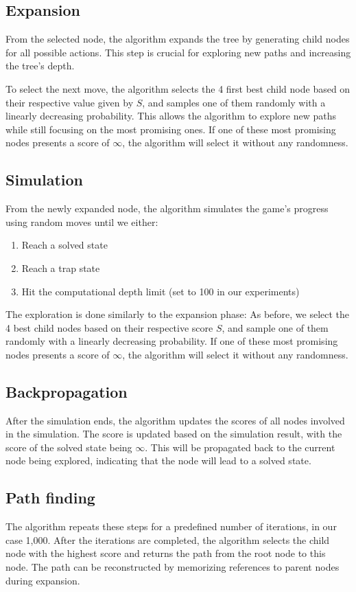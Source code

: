 \subsection{Expansion}
From the selected node, the algorithm expands the tree by generating child nodes for all possible actions. This step is crucial for exploring new paths and increasing the tree's depth.

To select the next move, the algorithm selects the 4 first best child node based on their respective value given by $S$, and samples one of them randomly with a linearly decreasing probability. This allows the algorithm to explore new paths while still focusing on the most promising ones. If one of these most promising nodes presents a score of $\infty$, the algorithm will select it without any randomness.

\subsection{Simulation}
From the newly expanded node, the algorithm simulates the game's progress using random moves until we either:
\begin{enumerate}
    \item Reach a solved state
    \item Reach a trap state
    \item Hit the computational depth limit (set to 100 in our experiments)
\end{enumerate}
The exploration is done similarly to the expansion phase: As before, we select the 4 best child nodes based on their respective score $S$, and sample one of them randomly with a linearly decreasing probability. If one of these most promising nodes presents a score of $\infty$, the algorithm will select it without any randomness.

\subsection{Backpropagation}
After the simulation ends, the algorithm updates the scores of all nodes involved in the simulation. The score is updated based on the simulation result, with the score of the solved state being $\infty$. This will be propagated back to the current node being explored, indicating that the node will lead to a solved state.

\subsection{Path finding}
The algorithm repeats these steps for a predefined number of iterations, in our case 1,000. After the iterations are completed, the algorithm selects the child node with the highest score and returns the path from the root node to this node. The path can be reconstructed by memorizing references to parent nodes during expansion.

